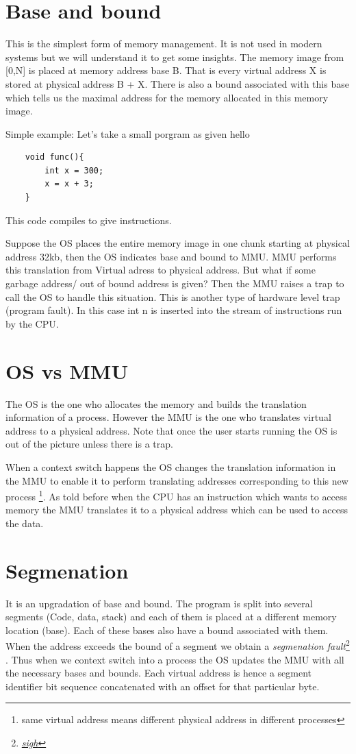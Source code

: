 \documentclass[12pt]{article}
\begin{document}
\section{Base and bound}
This is the simplest form of memory management. It is not used in modern systems but we will understand it to get some insights. The memory image
from [0,N] is placed at memory address base B. That is every virtual address X is stored at physical address B + X. There is also a bound associated with this base which tells us 
the maximal address for the memory allocated in this memory image.



Simple example: Let's take a small porgram as given hello

\begin{lstlisting}
    void func(){
        int x = 300;
        x = x + 3;
    }
\end{lstlisting}
This code compiles to give instructions. 

Suppose the OS places the entire memory image in one chunk starting at physical address 32kb, then the OS indicates base and bound to MMU. 
MMU performs this translation from Virtual adress to physical address. But what if some garbage address/ out of bound address is given? Then the
MMU raises a trap to call the OS to handle this situation. This is another type of hardware level trap (program fault). In this case int n is inserted into the 
stream of instructions run by the CPU. 

\section{OS vs MMU}
The OS is the one who allocates the memory and builds the translation information of a process. However the MMU
is the one who translates virtual address to a physical address. Note that once the user starts running the OS is out of the picture unless there is a trap.

When a context switch happens the OS changes the translation information in the MMU to enable it to perform translating addresses corresponding to this new process \footnote{same virtual address means different physical address in different processes}. 
As told before when the CPU has an instruction which wants to access memory the MMU translates it to a physical address which can be used to access the data.

\section{Segmenation}
It is an upgradation of base and bound. The program is split into several segments (Code, data, stack) and each of them is placed at a different memory location (base).
Each of these bases also have a bound associated with them. When the address exceeds the bound of a segment we obtain a \textit{segmenation fault}\footnote{\href{https://www.youtube.com/watch?v=NAEppFUWLfc}{\textit{sigh}}}
. Thus when we context switch into a process the OS updates the MMU with all the necessary bases and bounds.
Each virtual address is hence a segment identifier bit sequence concatenated with an offset for that particular byte.
\end{document}
